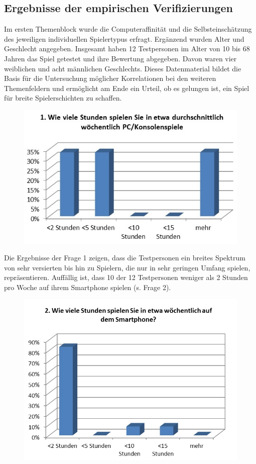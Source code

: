\documentclass[extern,palatino]{cgBA}
\begin{document}
\subsection{Ergebnisse der empirischen Verifizierungen}
Im ersten Themenblock wurde die Computeraffinität und die Selbsteinschätzung des jeweiligen individuellen Spielertypus erfragt. Ergänzend wurden Alter und Geschlecht angegeben. Insgesamt haben 12 Testpersonen im Alter von 10 bis 68 Jahren das Spiel getestet und ihre Bewertung abgegeben. Davon waren vier weiblichen und acht männlichen Geschlechts. Dieses Datenmaterial bildet die Basis für die Untersuchung möglicher Korrelationen bei den weiteren Themenfeldern und ermöglicht am Ende ein Urteil, ob es gelungen ist, ein Spiel für breite Spielerschichten zu schaffen. 
\begin{figure}[H]
	\centering
	\includegraphics[width=1\textwidth]{table0.jpg}
\end{figure}
Die Ergebnisse der Frage 1 zeigen, dass die Testpersonen ein breites Spektrum von sehr versierten bis hin zu Spielern, die nur in sehr geringen Umfang spielen, repräsentieren. Auffällig ist, dass 10 der 12 Testpersonen weniger als 2 Stunden pro Woche auf ihrem Smartphone spielen (s. Frage 2).
\begin{figure}[H]
	\centering
	\includegraphics[width=1\textwidth]{table1.jpg}
\end{figure}
\end{document}
